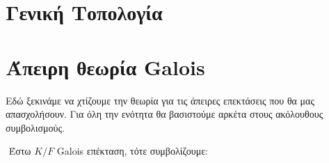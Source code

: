 \documentclass[oneside,a4paper]{article}
\newcommand {\tl}{\textlatin}
\newcommand{\Q}{\mathbb{Q}}
\begin{document}
\begin{center}
\end{center}




















\pagebreak
\section{Γενική Τοπολογία}
\pagebreak
\section{Άπειρη θεωρία \tl{Galois}}
\vspace{1cm}

Εδώ ξεκινάμε να χτίζουμε την θεωρία για τις άπειρες επεκτάσεις που θα μας απασχολήσουν. Για όλη την ενότητα θα βασιστούμε αρκέτα στους ακόλουθους συμβολισμούς.

$ $\newline
\noindent Έστω $K/F$ \tl{Galois} επέκταση, τότε συμβολίζουμε:
\end{document}
